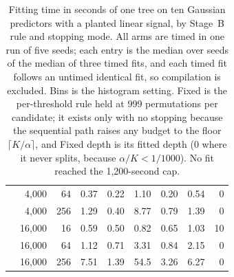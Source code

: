 \begin{table}[!htbp]
\begin{tabular}{@{}lrrrrrrrr@{}}
     & 4,000 & 64 & 0.37 & 0.22 & 1.10 & 0.20 & 0.54 & 0 \\
     & 4,000 & 256 & 1.29 & 0.40 & 8.77 & 0.79 & 1.39 & 0 \\
     & 16,000 & 16 & 0.59 & 0.50 & 0.82 & 0.65 & 1.03 & 10 \\
     & 16,000 & 64 & 1.12 & 0.71 & 3.31 & 0.84 & 2.15 & 0 \\
     & 16,000 & 256 & 7.51 & 1.39 & 54.5 & 3.26 & 6.27 & 0 \\
    \bottomrule
  \end{tabular}
  \caption{Fitting time in seconds of one tree on ten Gaussian predictors with a
  planted linear signal, by Stage~B rule and stopping mode. All arms are timed in one run of five
  seeds; each entry is the median over seeds of the median of three timed fits,
  and each timed fit follows an untimed identical fit, so compilation is
  excluded. Bins is the histogram setting. Fixed is the
  per-threshold rule held at 999 permutations per candidate; it exists only with
  no stopping because the sequential path raises any budget to the floor
  $\lceil K/\alpha \rceil$, and Fixed depth is its fitted depth (0 where it never
  splits, because $\alpha/K < 1/1000$). No fit reached the 1,200-second cap.}
  \label{tab:stageB-scaling}
\end{table}

